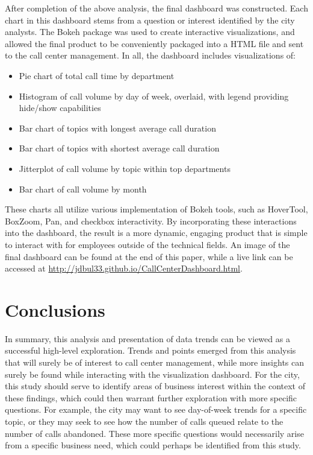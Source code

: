 \documentclass{article}
\begin{document}
After completion of the above analysis, the final dashboard was constructed.  Each chart in this dashboard stems from a question or interest identified by the city analysts.  The Bokeh package was used to create interactive visualizations, and allowed the final product to be conveniently packaged into a HTML file and sent to the call center management.  In all, the dashboard includes visualizations of:

\begin{itemize}
  \item{Pie chart of total call time by department}
  \item{Histogram of call volume by day of week, overlaid, with legend providing hide/show capabilities}
  \item{Bar chart of topics with longest average call duration}
  \item{Bar chart of topics with shortest average call duration}
  \item{Jitterplot of call volume by topic within top departments}
  \item{Bar chart of call volume by month}
\end{itemize}

These charts all utilize various implementation of Bokeh tools, such as HoverTool, BoxZoom, Pan, and checkbox interactivity.  By incorporating these interactions into the dashboard, the result is a more dynamic, engaging product that is simple to interact with for employees outside of the technical fields.  An image of the final dashboard can be found at the end of this paper, while a live link can be accessed at \href{http://jdbul33.github.io/CallCenterDashboard.html}{http://jdbul33.github.io/CallCenterDashboard.html}.


\section{Conclusions}

In summary, this analysis and presentation of data trends can be viewed as a successful high-level exploration.  Trends and points emerged from this analysis that will surely be of interest to call center management, while more insights can surely be found while interacting with the visualization dashboard.  For the city, this study should serve to identify areas of business interest within the context of these findings, which could then warrant further exploration with more specific questions.  For example, the city may want to see day-of-week trends for a specific topic, or they may seek to see how the number of calls queued relate to the number of calls abandoned.  These more specific questions would necessarily arise from a specific business need, which could perhaps be identified from this study.
\end{document}
